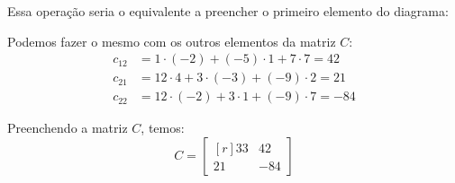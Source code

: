 \begin{minipage}{\textwidth}
    \begin{multicols}{2}
        \noindent Essa operação seria o equivalente a preencher o primeiro elemento do diagrama:
        \smallskip
    
        
        
        \columnbreak
        
        \noindent Podemos fazer o mesmo com os outros elementos da matriz $C$:
        \begin{align*}
            c_{12}&=1\cdot(-2) + (-5) \cdot 1 + 7 \cdot 7=42\\
            c_{21}&= 12\cdot4 +3\cdot(-3)+ (-9)\cdot2=21\\
            c_{22}&= 12\cdot(-2)+3 \cdot1 +(-9)\cdot7=-84
        \end{align*}
        
        \noindent Preenchendo a matriz $C$, temos:
        $$
        C=
        \begin{bmatrix*}[r]
            33 & 42 \\21 & -84
        \end{bmatrix*}
        $$
        \null
    \end{multicols}
\end{minipage}
